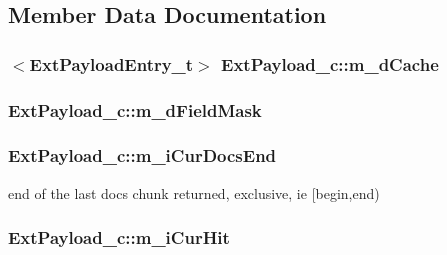 \subsection{Member Data Documentation}
\hypertarget{classExtPayload__c_a14e70e413b0661e061307a8b5cf4371a}{
\subsubsection[{m\-\_\-d\-Cache}]{$<${\bf Ext\-Payload\-Entry\-\_\-t}$>$ Ext\-Payload\-\_\-c\-::m\-\_\-d\-Cache\hspace{0.3cm}{\ttfamily [private]}}}\label{classExtPayload__c_a14e70e413b0661e061307a8b5cf4371a}
\hypertarget{classExtPayload__c_a3b64211b124ac95030d03f65c84ba19d}{
\subsubsection[{m\-\_\-d\-Field\-Mask}]{ Ext\-Payload\-\_\-c\-::m\-\_\-d\-Field\-Mask\hspace{0.3cm}{\ttfamily [private]}}}\label{classExtPayload__c_a3b64211b124ac95030d03f65c84ba19d}
\hypertarget{classExtPayload__c_a7f374e974aa7c12da38e4daec9489dc6}{
\subsubsection[{m\-\_\-i\-Cur\-Docs\-End}]{ Ext\-Payload\-\_\-c\-::m\-\_\-i\-Cur\-Docs\-End\hspace{0.3cm}{\ttfamily [private]}}}\label{classExtPayload__c_a7f374e974aa7c12da38e4daec9489dc6}


end of the last docs chunk returned, exclusive, ie \mbox{[}begin,end) 

\hypertarget{classExtPayload__c_a83bcd96ecd069097e5ce0780f80d8536}{
\subsubsection[{m\-\_\-i\-Cur\-Hit}]{ Ext\-Payload\-\_\-c\-::m\-\_\-i\-Cur\-Hit\hspace{0.3cm}{\ttfamily [private]}}}\label{classExtPayload__c_a83bcd96ecd069097e5ce0780f80d8536}


